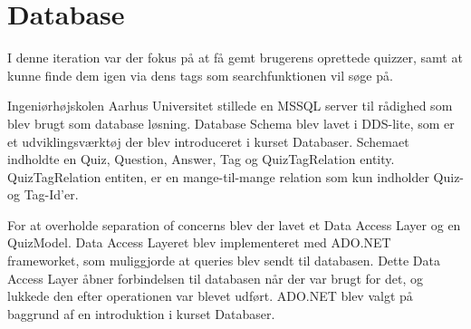 \chapter{Database}
I denne iteration var der fokus på at få gemt brugerens oprettede quizzer, samt at kunne finde dem igen via dens tags som searchfunktionen vil søge på. 

Ingeniørhøjskolen Aarhus Universitet stillede en MSSQL server til rådighed som blev brugt som database løsning. Database Schema blev lavet i DDS-lite, som er et udviklingsværktøj der blev introduceret i kurset Databaser. Schemaet indholdte en Quiz, Question, Answer, Tag og QuizTagRelation entity. QuizTagRelation entiten, er en mange-til-mange relation som kun indholder Quiz- og Tag-Id'er.


For at overholde separation of concerns blev der lavet et Data Access Layer og en QuizModel. Data Access Layeret blev implementeret med ADO.NET frameworket, som muliggjorde at queries blev sendt til databasen. Dette Data Access Layer åbner forbindelsen til databasen når der var brugt for det, og lukkede den efter operationen var blevet udført. ADO.NET blev valgt på baggrund af en introduktion i kurset Databaser.




